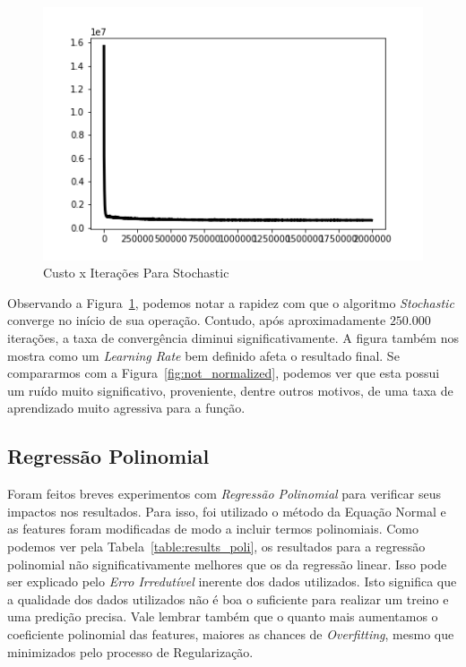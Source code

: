 \documentclass[conference]{IEEEtran}
\begin{document}
\begin{figure}[H]
  \includegraphics[width=\linewidth]{gfx/S_costitr_mitr2000000.png}
  \caption{Custo x Iterações Para Stochastic}
  \label{fig:costs_sto}
\end{figure}

%

Observando a Figura~\ref{fig:costs_sto}, podemos notar a rapidez com que o algoritmo \textit{Stochastic} converge no início de sua operação. Contudo, após aproximadamente $250.000$ iterações, a taxa de convergência diminui significativamente. A figura também nos mostra como um \textit{Learning Rate} bem definido afeta  o resultado final. Se compararmos com a Figura~\ref{fig:not_normalized}, podemos ver que esta possui um ruído muito significativo, proveniente, dentre outros motivos, de uma taxa de aprendizado muito agressiva para a função.

\subsection{Regressão Polinomial}

Foram feitos breves experimentos com \textit{Regressão Polinomial} para verificar seus impactos nos resultados. Para isso, foi utilizado o método da Equação Normal e as features foram modificadas de modo a incluir termos polinomiais. Como podemos ver pela Tabela~\ref{table:results_poli}, os resultados para a regressão polinomial não significativamente melhores que os da regressão linear. Isso pode ser explicado pelo \textit{Erro Irredutível} inerente dos dados utilizados. Isto significa que a qualidade dos dados utilizados não é boa o suficiente para realizar um treino e uma predição precisa. Vale lembrar também que o quanto mais aumentamos o coeficiente polinomial das features, maiores as chances de \textit{Overfitting}, mesmo que minimizados pelo processo de Regularização.
\end{document}
